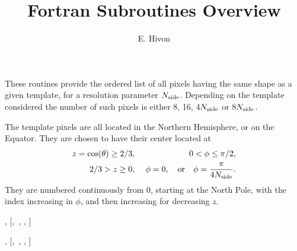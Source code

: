 
\sloppy


\title{\healpix Fortran Subroutines Overview}
 \section[same\_shape\_pixels\_nest, same\_shape\_pixels\_ring]{ }
\label{sub:same_shape_pixels_xxx}
\author{E. Hivon}

\begin{facility}
{These routines provide the ordered list of all \healpix pixels having the same shape
  as a given template, for a resolution parameter ${N_{\rm side}}$. Depending on the
  template considered the number of such pixels is either 8, 16, 4${N_{\rm side}}$ or
  8${N_{\rm side}}$.


The template pixels are all located in the Northern Hemisphere, or on the
 Equator.
They are chosen to have their center located at
\begin{eqnarray}
	\label{eq:same_shape_pixel_xxx}
     z=\cos(\theta)\ge 2/3,  &\ &    0< \phi \leq \pi/2,   \nonumber\\            %
     2/3 > z \geq 0,  &\ & \phi=0, \quad{\rm or}\quad  \phi=\frac{\pi}{4\nside}.  %
\myhtmlimage{}
\end{eqnarray}
 They are numbered continuously from 0, starting at the North Pole, with the index
 increasing in $\phi$, and then increasing for decreasing $z$.
}
{\modPixTools}
\end{facility}

\begin{f90format}
{%
 , 
[,~, 
 , 
 ]}
\end{f90format}
\begin{f90format}
{%
 , 
[,~, 
 , 
 ]}
\end{f90format}

